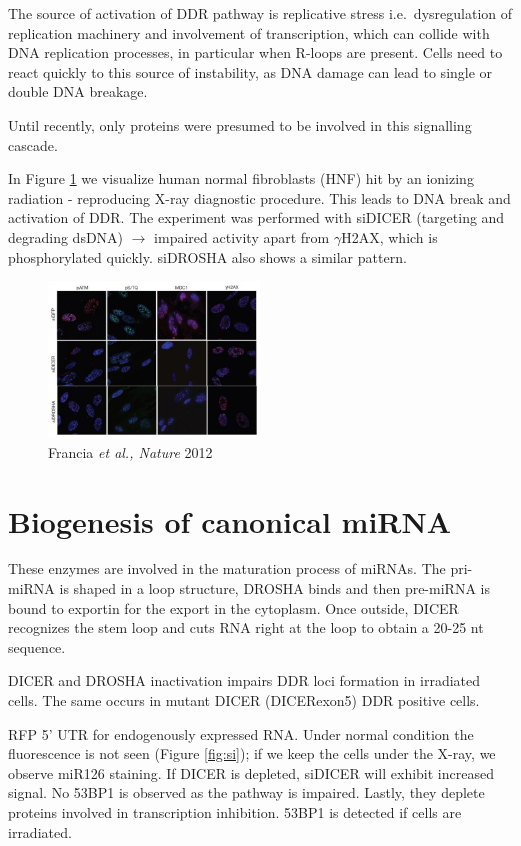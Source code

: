 The source of activation of DDR pathway is replicative stress i.e.~dysregulation of replication machinery and involvement of transcription, which can collide with DNA replication processes, in particular when R-loops are present. Cells need to react quickly to this source of instability, as DNA damage can lead to single or double DNA breakage.

Until recently, only proteins were presumed to be involved in this signalling cascade.

In Figure \ref{fig:hnf} we visualize human normal fibroblasts (HNF) hit by an ionizing radiation - reproducing X-ray diagnostic procedure. This leads to DNA break and activation of DDR. The experiment was performed with siDICER (targeting and degrading dsDNA) $\rightarrow$ impaired activity apart from \(\gamma\)H2AX, which is phosphorylated quickly. siDROSHA also shows a similar pattern.

\begin{figure}
\centering
\includegraphics[width=0.5\textwidth]{Screen_Shot_2022-12-07_at_08-58-00.png}
\caption{Francia \emph{et al., Nature} 2012}
\label{fig:hnf}
\end{figure}

\hypertarget{biogenesis-of-canonical-mirna}{%
\section{Biogenesis of canonical miRNA}\label{biogenesis-of-canonical-mirna}}

These enzymes are involved in the maturation process of miRNAs. The pri-miRNA is shaped in a loop structure, DROSHA binds and then pre-miRNA is bound to exportin for the export in the cytoplasm. Once outside, DICER recognizes the stem loop and cuts RNA right at the loop to obtain a 20-25 nt sequence.

DICER and DROSHA inactivation impairs DDR loci formation in irradiated cells. The same occurs in mutant DICER (DICERexon5) DDR positive cells.

RFP 5' UTR for endogenously expressed RNA. Under normal condition the fluorescence is not seen (Figure \ref{fig:si}); if we keep the cells under the X-ray, we observe miR126 staining. If DICER is depleted, siDICER will exhibit increased signal. No 53BP1 is observed as the pathway is impaired. Lastly, they deplete proteins involved in transcription inhibition. 53BP1 is detected if cells are irradiated.

